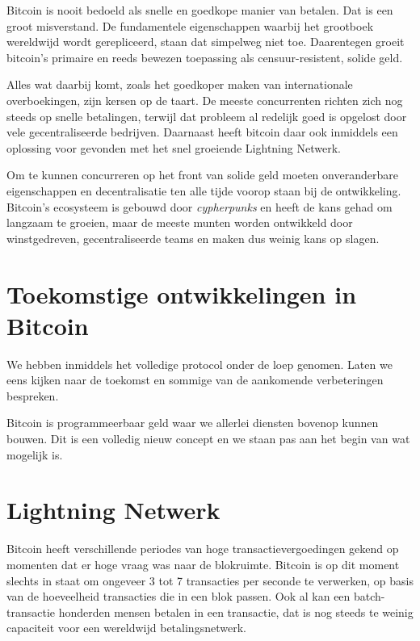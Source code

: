 \documentclass[
  letterpaper,
]{scrbook}
\begin{document}
Bitcoin is nooit bedoeld als snelle en goedkope manier van betalen. Dat
is een groot misverstand. De fundamentele eigenschappen waarbij het
grootboek wereldwijd wordt gerepliceerd, staan dat simpelweg niet toe.
Daarentegen groeit bitcoin's primaire en reeds bewezen toepassing als
censuur-resistent, solide geld.

Alles wat daarbij komt, zoals het goedkoper maken van internationale
overboekingen, zijn kersen op de taart. De meeste concurrenten richten
zich nog steeds op snelle betalingen, terwijl dat probleem al redelijk
goed is opgelost door vele gecentraliseerde bedrijven. Daarnaast heeft
bitcoin daar ook inmiddels een oplossing voor gevonden met het snel
groeiende Lightning Netwerk.

Om te kunnen concurreren op het front van solide geld moeten
onveranderbare eigenschappen en decentralisatie ten alle tijde voorop
staan bij de ontwikkeling. Bitcoin's ecosysteem is gebouwd door
\emph{cypherpunks} en heeft de kans gehad om langzaam te groeien, maar
de meeste munten worden ontwikkeld door winstgedreven, gecentraliseerde
teams en maken dus weinig kans op slagen.

\hypertarget{toekomstige-ontwikkelingen-in-bitcoin}{%
\section{Toekomstige ontwikkelingen in
Bitcoin}\label{toekomstige-ontwikkelingen-in-bitcoin}}

We hebben inmiddels het volledige protocol onder de loep genomen. Laten
we eens kijken naar de toekomst en sommige van de aankomende
verbeteringen bespreken.

Bitcoin is programmeerbaar geld waar we allerlei diensten bovenop kunnen
bouwen. Dit is een volledig nieuw concept en we staan pas aan het begin
van wat mogelijk is.

\hypertarget{lightning-netwerk}{%
\section{Lightning Netwerk}\label{lightning-netwerk}}

Bitcoin heeft verschillende periodes van hoge transactievergoedingen
gekend op momenten dat er hoge vraag was naar de blokruimte. Bitcoin is
op dit moment slechts in staat om ongeveer 3 tot 7 transacties per
seconde te verwerken, op basis van de hoeveelheid transacties die in een
blok passen. Ook al kan een batch-transactie honderden mensen betalen in
een transactie, dat is nog steeds te weinig capaciteit voor een
wereldwijd betalingsnetwerk.
\end{document}
